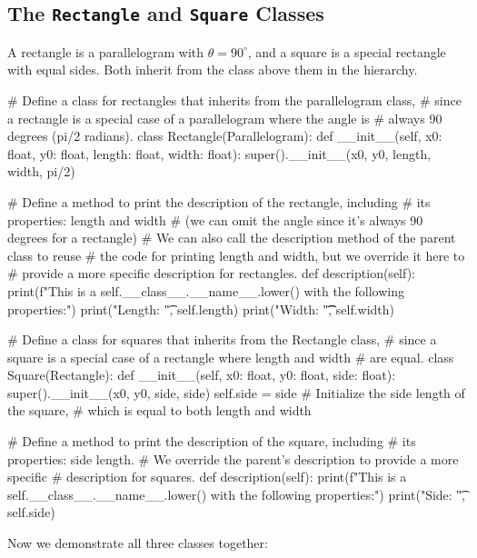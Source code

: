 \documentclass[11pt, a4paper]{article}
\begin{document}
\subsection{The \texttt{Rectangle} and \texttt{Square} Classes}

A rectangle is a parallelogram with $\theta = 90^{\circ}$, and a square is a special rectangle with equal sides. Both inherit from the class above them in the
hierarchy.

\begin{pycode}
# Define a class for rectangles that inherits from the parallelogram class,
# since a rectangle is a special case of a parallelogram where the angle is
# always 90 degrees (pi/2 radians).
class Rectangle(Parallelogram):
    def __init__(self, x0: float, y0: float,
                 length: float, width: float):
        super().__init__(x0, y0, length, width, pi/2)

    # Define a method to print the description of the rectangle, including
    # its properties: length and width
    # (we can omit the angle since it's always 90 degrees for a rectangle)
    # We can also call the description method of the parent class to reuse
    # the code for printing length and width, but we override it here to
    # provide a more specific description for rectangles.
    def description(self):
        print(f"This is a {self.__class__.__name__.lower()} with the following properties:")
        print("Length: \t", self.length)
        print("Width: \t\t", self.width)

# Define a class for squares that inherits from the Rectangle class,
# since a square is a special case of a rectangle where length and width
# are equal.
class Square(Rectangle):
    def __init__(self, x0: float, y0: float, side: float):
        super().__init__(x0, y0, side, side)
        self.side = side  # Initialize the side length of the square,
                          # which is equal to both length and width

    # Define a method to print the description of the square, including
    # its properties: side length.
    # We override the parent's description to provide a more specific
    # description for squares.
    def description(self):
        print(f"This is a {self.__class__.__name__.lower()} with the following properties:")
        print("Side: \t", self.side)
\end{pycode}

Now we demonstrate all three classes together:
\end{document}
